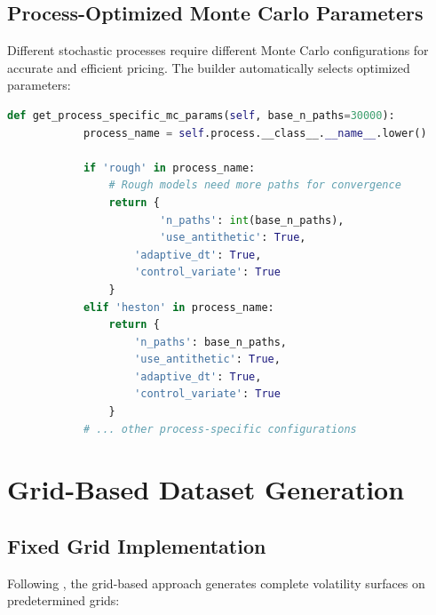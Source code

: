 	\subsection{Process-Optimized Monte Carlo Parameters}
	
	Different stochastic processes require different Monte Carlo configurations for accurate and efficient pricing. The builder automatically selects optimized parameters:
	
	\begin{lstlisting}[language=Python, basicstyle=\ttfamily\footnotesize, 
		frame=single, rulecolor=\color{black!20}, backgroundcolor=\color{gray!5},
		showstringspaces=false, breaklines=true, columns=fullflexible]
		def get_process_specific_mc_params(self, base_n_paths=30000):
		    process_name = self.process.__class__.__name__.lower()
		
		    if 'rough' in process_name:
		    	# Rough models need more paths for convergence
		        return {
		        		'n_paths': int(base_n_paths),
			        	'use_antithetic': True,
					'adaptive_dt': True,
					'control_variate': True
				}
			elif 'heston' in process_name:
				return {
					'n_paths': base_n_paths,
					'use_antithetic': True,
					'adaptive_dt': True,
					'control_variate': True
				}
			# ... other process-specific configurations
	\end{lstlisting}
	
	\section{Grid-Based Dataset Generation}
	
	\subsection{Fixed Grid Implementation}
	
	Following \citet{Horvath2021DLV}, the grid-based approach generates complete volatility surfaces on predetermined grids:
	
